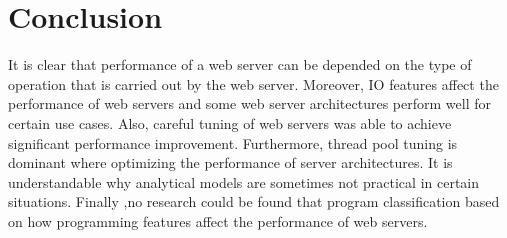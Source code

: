 \section{Conclusion}

It is clear that performance of a web server can be depended on the type of operation that is carried out by the web server. Moreover, IO features affect the performance of web servers and some web server architectures perform well for certain use cases. Also, careful tuning of web servers was able to achieve significant performance improvement. Furthermore, thread pool tuning is dominant where optimizing the performance of server architectures. It is understandable why analytical models are sometimes not practical in certain situations. Finally ,no research could be found that program classification based on how programming features affect the performance of web servers.    

